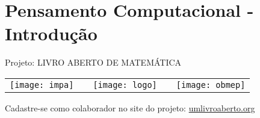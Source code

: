 \ifnum{}
\renewcommand\chapterillustration{./abertura-computacional}
\else
\renewcommand\chapterillustration{./abertura-computacional-professor}
\fi

\renewcommand\chapterwhat{Pensamento computacional e noções básicas de linguagem de programação.
}
\renewcommand\chapterbecause{Os computadores estão presentes em quase todas as atividades humanas na atualidade e, por isso, desenvolver o pensamento computacional e conhecer noções básicas de linguagens de programação pode ser fundamental para sua vida profissional, trajetória acadêmica e participação efetiva na sociedade.
} 
\chapter{Pensamento Computacional - Introdução}
\label{computacional-chap}

\mbox{}\thispagestyle{empty}\clearpage

\thispagestyle{empty}

\begin{center}
Projeto: LIVRO ABERTO DE MATEMÁTICA

\noindent \begin{tabular}{lcccr}
\texttt{[image: impa]}& \quad\quad& \texttt{[image: logo]} & \quad\quad& \texttt{[image: obmep]} 
\end{tabular}
\end{center}

\vspace*{.3cm}

Cadastre-se como colaborador no site do projeto: \url{umlivroaberto.org}





